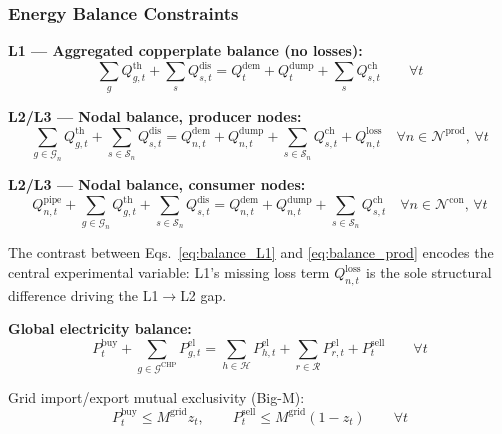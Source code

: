 \documentclass[review,3p]{elsarticle}
\begin{document}
\subsubsection{Energy Balance Constraints}
\label{sec:model_balance}

\textbf{L1 --- Aggregated copperplate balance (no losses):}
\begin{equation}
\sum_{g} Q_{g,t}^{\mathrm{th}}
+ \sum_{s} Q_{s,t}^{\mathrm{dis}}
= Q_t^{\mathrm{dem}} + Q_t^{\mathrm{dump}}
+ \sum_{s} Q_{s,t}^{\mathrm{ch}}
\qquad \forall t
\label{eq:balance_L1}
\end{equation}

\textbf{L2/L3 --- Nodal balance, producer nodes:}
\begin{equation}
\sum_{g \in \mathcal{G}_n} Q_{g,t}^{\mathrm{th}}
+ \sum_{s \in \mathcal{S}_n} Q_{s,t}^{\mathrm{dis}}
= Q_{n,t}^{\mathrm{dem}} + Q_{n,t}^{\mathrm{dump}}
+ \sum_{s \in \mathcal{S}_n} Q_{s,t}^{\mathrm{ch}}
+ Q_{n,t}^{\mathrm{loss}}
\quad \forall n \in \mathcal{N}^{\mathrm{prod}},\, \forall t
\label{eq:balance_prod}
\end{equation}

\textbf{L2/L3 --- Nodal balance, consumer nodes:}
\begin{equation}
Q_{n,t}^{\mathrm{pipe}}
+ \sum_{g \in \mathcal{G}_n} Q_{g,t}^{\mathrm{th}}
+ \sum_{s \in \mathcal{S}_n} Q_{s,t}^{\mathrm{dis}}
= Q_{n,t}^{\mathrm{dem}} + Q_{n,t}^{\mathrm{dump}}
+ \sum_{s \in \mathcal{S}_n} Q_{s,t}^{\mathrm{ch}}
\quad \forall n \in \mathcal{N}^{\mathrm{con}},\, \forall t
\label{eq:balance_consumer}
\end{equation}

The contrast between Eqs.~\eqref{eq:balance_L1} and
\eqref{eq:balance_prod} encodes the central experimental variable:
L1's missing loss term $Q_{n,t}^{\mathrm{loss}}$ is the sole
structural difference driving the L1$\rightarrow$L2 gap.

\textbf{Global electricity balance:}
\begin{equation}
P_t^{\mathrm{buy}} + \sum_{g \in \mathcal{G}^{\mathrm{CHP}}}
P_{g,t}^{\mathrm{el}}
= \sum_{h \in \mathcal{H}} P_{h,t}^{\mathrm{el}}
+ \sum_{r \in \mathcal{R}} P_{r,t}^{\mathrm{el}}
+ P_t^{\mathrm{sell}}
\qquad \forall t
\label{eq:balance_el}
\end{equation}

Grid import/export mutual exclusivity (Big-M):
\begin{equation}
P_t^{\mathrm{buy}} \leq M^{\mathrm{grid}} z_t, \qquad
P_t^{\mathrm{sell}} \leq M^{\mathrm{grid}} (1 - z_t)
\qquad \forall t
\label{eq:grid_bigm}
\end{equation}
\end{document}
